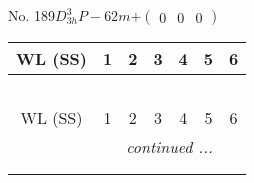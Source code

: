 \documentclass[fleqn,9pt,landscape]{jsarticle}
\begin{document}
\newpage
No. 189\quad$D_{3h}^{3}$\quad$P-62m$\quad[ hexagonal ]\quad$+\begin{pmatrix} 0 & 0 & 0 \end{pmatrix}$
\begin{center}
\renewcommand{\arraystretch}{1.2}
\begin{longtable}{ccccccc}
 \hline \hline
WL (SS) & 1 & 2 & 3 & 4 & 5 & 6 \\ \hline \endfirsthead

\multicolumn{6}{l}{\tablename\ \thetable{}} \\
 \hline \hline
WL (SS) & 1 & 2 & 3 & 4 & 5 & 6 \\ \hline \endhead

 \hline \hline
\multicolumn{6}{r}{\footnotesize\it continued ...} \\ \endfoot

 \hline \hline
\multicolumn{6}{r}{} \\ \endlastfoot


\end{longtable}
\end{center}
\end{document}
